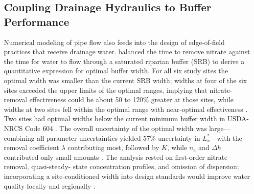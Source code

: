 \subsection{Coupling Drainage Hydraulics to Buffer Performance}

Numerical modeling of pipe flow also feeds into the design of edge-of-field practices that
receive drainage water. \textcite{McEachran2020} balanced the time to remove nitrate
against the time for water to flow through a saturated riparian buffer (SRB) to derive a
quantitative expression for optimal buffer width. For all six study sites the optimal width
was smaller than the current SRB width; widths at four of the six sites exceeded the upper
limits of the optimal ranges, implying that nitrate-removal effectiveness could be about 50
to 120\% greater at those sites, while widths at two sites fell within the optimal range
with near-optimal effectiveness \parencite{McEachran2020}. Two sites had optimal widths
below the current minimum buffer width in USDA-NRCS Code 604 \parencite{McEachran2020}. The
overall uncertainty of the optimal width was large---combining all parameter uncertainties
yielded 57\% uncertainty in $L_x^*$---with the removal coefficient $\lambda$ contributing
most, followed by $K$, while $n_e$ and $\Delta h$ contributed only small amounts
\parencite{McEachran2020}. The analysis rested on first-order nitrate removal, quasi-steady-
state concentration profiles, and omission of dispersion; incorporating a site-conditioned
width into design standards would improve water quality locally and regionally
\parencite{McEachran2020}.